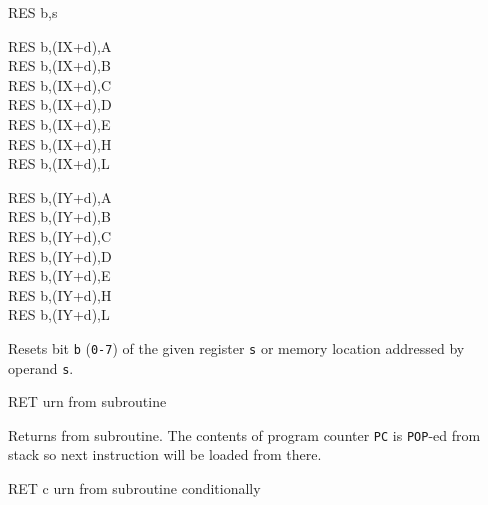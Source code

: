 \begin{basedescript}{
	\desclabelstyle{\multilinelabel}
	\desclabelwidth{3cm}}
\begin{DetailItem}{RES b,s}
\begin{DetailVariants}
			\columnbreak
			RES b,(IX+d),A\UNDOC\\
			RES b,(IX+d),B\UNDOC\\
			RES b,(IX+d),C\UNDOC\\
			RES b,(IX+d),D\UNDOC\\
			RES b,(IX+d),E\UNDOC\\
			RES b,(IX+d),H\UNDOC\\
			RES b,(IX+d),L\UNDOC

			\columnbreak
			RES b,(IY+d),A\UNDOC\\
			RES b,(IY+d),B\UNDOC\\
			RES b,(IY+d),C\UNDOC\\
			RES b,(IY+d),D\UNDOC\\
			RES b,(IY+d),E\UNDOC\\
			RES b,(IY+d),H\UNDOC\\
			RES b,(IY+d),L\UNDOC
		\end{DetailVariants}

		Resets bit {\tt b} ({\tt 0-7}) of the given register {\tt s} or memory location addressed by operand {\tt s}.

		\begin{DetailEffects}
			\FlagsRESr
		\end{DetailEffects}
						
		\begin{DetailTiming}
			\DetailTime[r]{2}{8}
			\DetailTime[(HL)]{4}{15}
			\DetailTime[(IX+d)]{6}{23}
			\DetailTime[(IY+d)]{6}{23}
		\end{DetailTiming}

	\end{DetailItem}

	\pagebreak
	\begin{DetailItem}{RET}
		{urn from subroutine}
		{\SymRET}

		Returns from subroutine. The contents of program counter {\tt PC} is {\tt POP}-ed from stack so next instruction will be loaded from there.

		\begin{DetailEffects}
			\FlagsRET
		\end{DetailEffects}
				
		\begin{DetailTiming}
			\DetailTime{3}{10}
		\end{DetailTiming}

	\end{DetailItem}

	\begin{DetailItem}{RET c}
		{urn from subroutine conditionally}
		{\SymRETc{c}}


\end{DetailItem}
\end{basedescript}
